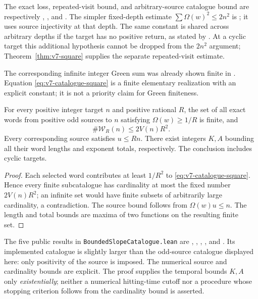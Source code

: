 The exact loss, repeated-visit bound, and arbitrary-source catalogue
bound are respectively
,
, and
.
The simpler fixed-depth estimate $\sum\Omega(w)^2\le2n^2$ is
; it uses source
injectivity at that depth. The same constant is shared across arbitrary
depths if the target has no positive return, as stated by
.
At a cyclic target this additional hypothesis cannot be dropped from
the $2n^2$ argument; Theorem~\ref{thm:v7-square} supplies the separate
repeated-visit estimate.

The corresponding infinite integer Green sum was already shown finite
in \cite[Proposition~11]{weaver9v1}. Equation
\eqref{eq:v7-catalogue-square} is a finite elementary realization with
an explicit constant; it is not a priority claim for Green finiteness.

\begin{corollary}
\label{cor:v7-bounded-catalogue}
For every positive integer target $n$ and positive rational $R$, the
set of all exact words from positive odd sources to $n$ satisfying
$\Omega(w)\ge1/R$ is finite, and
\begin{equation}\label{eq:v7-catalogue-card}
 \#\mathcal W_R(n)\le2V(n)R^2.
\end{equation}
Every corresponding source satisfies $u\le Rn$. There exist integers
$K,A$ bounding all their word lengths and exponent totals, respectively.
The conclusion includes cyclic targets.
\end{corollary}
\begin{proof}
Each selected word contributes at least $1/R^2$ to
\eqref{eq:v7-catalogue-square}. Hence every finite subcatalogue has
cardinality at most the fixed number $2V(n)R^2$; an infinite set would
have finite subsets of arbitrarily large cardinality, a contradiction.
The source bound follows from $\Omega(w)u\le n$. The length and total
bounds are maxima of two functions on the resulting finite set.
\end{proof}

The five public results in \texttt{BoundedSlopeCatalogue.lean} are
, ,
, , and
. Its implemented catalogue is slightly
larger than the odd-source catalogue displayed here: only positivity of
the source is imposed. The numerical source and cardinality bounds are
explicit. The proof supplies the temporal bounds $K,A$ only
\emph{existentially}; neither a numerical hitting-time cutoff nor a
procedure whose stopping criterion follows from the cardinality bound
is asserted.

